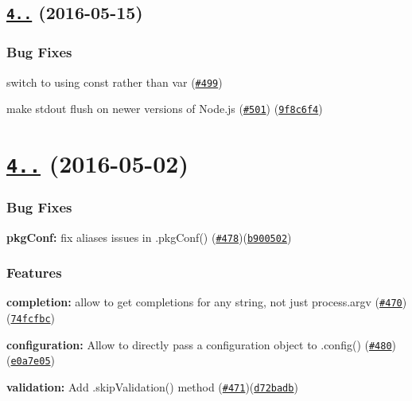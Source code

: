 \label{_4.7.1}%
 \subsection*{\href{https://github.com/yargs/yargs/compare/v4.7.0...v4.7.1}{\tt 4..} (2016-\/05-\/15)}

\subsubsection*{Bug Fixes}


\begin{DoxyItemize}
\item switch to using {\ttfamily const} rather than {\ttfamily var} (\href{https://github.com/yargs/yargs/pull/499}{\tt \#499})
\item make stdout flush on newer versions of Node.\+js (\href{https://github.com/yargs/yargs/issues/501}{\tt \#501}) (\href{https://github.com/yargs/yargs/commit/9f8c6f4}{\tt 9f8c6f4})
\end{DoxyItemize}

\label{_4.7.0}%
 \section*{\href{https://github.com/yargs/yargs/compare/v4.6.0...v4.7.0}{\tt 4..} (2016-\/05-\/02)}

\subsubsection*{Bug Fixes}


\begin{DoxyItemize}
\item {\bfseries pkg\+Conf\+:} fix aliases issues in .pkg\+Conf() (\href{https://github.com/yargs/yargs/issues/478}{\tt \#478})(\href{https://github.com/yargs/yargs/commit/b900502}{\tt b900502})
\end{DoxyItemize}

\subsubsection*{Features}


\begin{DoxyItemize}
\item {\bfseries completion\+:} allow to get completions for any string, not just process.\+argv (\href{https://github.com/yargs/yargs/issues/470}{\tt \#470})(\href{https://github.com/yargs/yargs/commit/74fcfbc}{\tt 74fcfbc})
\item {\bfseries configuration\+:} Allow to directly pass a configuration object to .config() (\href{https://github.com/yargs/yargs/issues/480}{\tt \#480})(\href{https://github.com/yargs/yargs/commit/e0a7e05}{\tt e0a7e05})
\item {\bfseries validation\+:} Add .skip\+Validation() method (\href{https://github.com/yargs/yargs/issues/471}{\tt \#471})(\href{https://github.com/yargs/yargs/commit/d72badb}{\tt d72badb})
\end{DoxyItemize}

